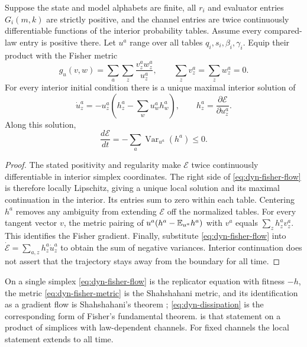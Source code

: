 Suppose the state and model alphabets are finite, all $r_i$ and evaluator entries $G_i(m,k)$ are strictly positive, and the channel entries are twice continuously differentiable functions of the interior probability tables. Assume every compared-law entry is positive there. Let $u^a$ range over all tables $q_i,s_i,\beta_i,\gamma_i$. Equip their product with the Fisher metric
\begin{equation}
 g_u(v,w)=\sum_a\sum_z\frac{v_z^aw_z^a}{u_z^a},
 \qquad \sum_zv_z^a=\sum_zw_z^a=0.
 \label{eq:dyn-fisher-metric}
\end{equation}
For every interior initial condition there is a unique maximal interior solution of
\begin{equation}
 \dot u_z^a=-u_z^a\left(h_z^a-\sum_wu_w^ah_w^a\right),
 \qquad h_z^a=\frac{\partial\mathcal E}{\partial u_z^a}.
 \label{eq:dyn-fisher-flow}
\end{equation}
Along this solution,
\begin{equation}
 \frac{d\mathcal E}{dt}
 =-\sum_a\operatorname{Var}_{u^a}(h^a)\leq0.
 \label{eq:dyn-dissipation}
\end{equation}
\begin{proof}
The stated positivity and regularity make $\mathcal E$ twice continuously differentiable in interior simplex coordinates. The right side of \cref{eq:dyn-fisher-flow} is therefore locally Lipschitz, giving a unique local solution and its maximal continuation in the interior. Its entries sum to zero within each table. Centering $h^a$ removes any ambiguity from extending $\mathcal E$ off the normalized tables. For every tangent vector $v$, the metric pairing of $u^a(h^a-\mathbb E_{u^a}h^a)$ with $v^a$ equals $\sum_zh_z^av_z^a$. This identifies the Fisher gradient. Finally, substitute \cref{eq:dyn-fisher-flow} into $\dot{\mathcal E}=\sum_{a,z}h_z^a\dot u_z^a$ to obtain the sum of negative variances. Interior continuation does not assert that the trajectory stays away from the boundary for all time.
\end{proof}

On a single simplex \cref{eq:dyn-fisher-flow} is the replicator equation with fitness $-h$, the metric \cref{eq:dyn-fisher-metric} is the Shahshahani metric, and its identification as a gradient flow is Shahshahani's theorem \citep{Shahshahani1979,HofbauerSigmund1998}; \cref{eq:dyn-dissipation} is the corresponding form of Fisher's fundamental theorem.  is that statement on a product of simplices with law-dependent channels. For fixed channels the local statement extends to all time.

